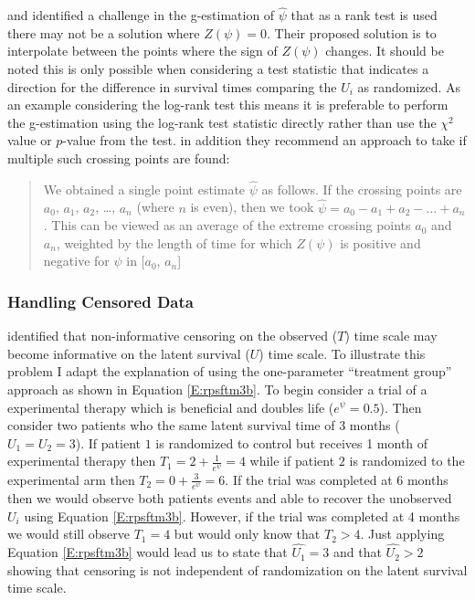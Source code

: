 \label{S:chap_methrev:ESTissues}
\cite{White1999} and \cite{White2002} identified a challenge in the g-estimation of $\hat{\psi}$ that as a rank test is used there may not be a solution where $Z(\psi)=0$.  Their proposed solution is to interpolate between the points where the sign of $Z(\psi)$ changes. It should be noted this is only possible when considering a test statistic that indicates a direction for the difference in survival times comparing the $U_i$ as randomized. As an example considering the log-rank test this means it is preferable to perform the g-estimation using the log-rank test statistic directly rather than use the $\chi^2$ value or $p$-value from the test. in addition they recommend an approach to take if multiple such crossing points are found:
\begin{quote}
We obtained a single point estimate $\hat{\psi}$ as follows. If the crossing points are $a_0$, $a_1$, $a_2$, \ldots, $a_n$ (where $n$ is even), then we took $\hat{\psi} = a_0 -a_1+a_2-\ldots+a_n$. This can be viewed as an average of the extreme crossing points $a_0$ and $a_n$, weighted by the length of time for which $Z(\psi)$ is positive and negative for $\psi$ in [$a_0$, $a_n$]
\end{quote}


\subsubsection{Handling Censored Data}
\cite{Robins1991} identified that non-informative censoring on the observed ($T$) time scale may become informative on the latent survival ($U$) time scale. To illustrate this problem I adapt the explanation of \cite{KorhonenRECORD} using the one-parameter ``treatment group'' approach as shown in Equation \ref{E:rpsftm3b}. To begin consider a trial of a experimental therapy which is beneficial and doubles life ($e^\psi=0.5$). Then consider two patients who the same latent survival time of 3 months ($U_1=U_2=3$). If patient $1$ is randomized to control but receives 1 month of experimental therapy then $T_1=2+\frac{1}{e^\psi}=4$ while if patient $2$ is randomized to the experimental arm then $T_2=0+\frac{3}{e^\psi}=6$. If the trial was completed at 6 months then we would observe both patients events and able to recover the unobserved $U_i$ using Equation \ref{E:rpsftm3b}. However, if the trial was completed at 4 months we would still observe $T_1=4$ but would only know that $T_2>4$. Just applying Equation \ref{E:rpsftm3b} would lead us to state that $\hat{U_1}=3$ and that $\hat{U_2}>2$ showing that censoring is not independent of randomization on the latent survival time scale.


